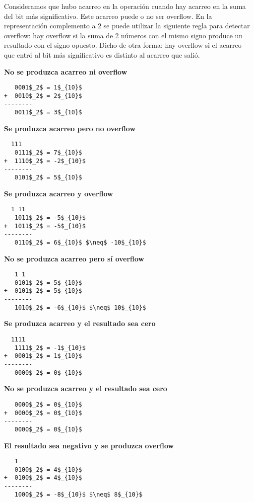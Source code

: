 Consideramos que hubo acarreo en la operación cuando hay acarreo en la suma del bit más significativo. Este acarreo puede o no ser overflow. En la representación complemento a 2 se puede utilizar la siguiente regla para detectar overflow: hay overflow si la suma de 2 números con el mismo signo produce un resultado con el signo opuesto. Dicho de otra forma: hay overflow si el acarreo que entró al bit más significativo es distinto al acarreo que salió.

\textbf{No se produzca acarreo ni overflow}
\begin{lstlisting}
   0001$_2$ = 1$_{10}$
+  0010$_2$ = 2$_{10}$
--------
   0011$_2$ = 3$_{10}$
\end{lstlisting}

\textbf{Se produzca acarreo pero no overflow}
\begin{lstlisting}
  111
   0111$_2$ = 7$_{10}$
+  1110$_2$ = -2$_{10}$
--------
   0101$_2$ = 5$_{10}$
\end{lstlisting}

\textbf{Se produzca acarreo y overflow}
\begin{lstlisting}
  1 11
   1011$_2$ = -5$_{10}$
+  1011$_2$ = -5$_{10}$
--------
   0110$_2$ = 6$_{10}$ $\neq$ -10$_{10}$
\end{lstlisting}

\textbf{No se produzca acarreo pero sí overflow}
\begin{lstlisting}
   1 1
   0101$_2$ = 5$_{10}$
+  0101$_2$ = 5$_{10}$
--------
   1010$_2$ = -6$_{10}$ $\neq$ 10$_{10}$
\end{lstlisting}

\textbf{Se produzca acarreo y el resultado sea cero}
\begin{lstlisting}
  1111
   1111$_2$ = -1$_{10}$
+  0001$_2$ = 1$_{10}$
--------
   0000$_2$ = 0$_{10}$
\end{lstlisting}

\textbf{No se produzca acarreo y el resultado sea cero}
\begin{lstlisting}
   0000$_2$ = 0$_{10}$
+  0000$_2$ = 0$_{10}$
--------
   0000$_2$ = 0$_{10}$
\end{lstlisting}

\textbf{El resultado sea negativo y se produzca overflow}
\begin{lstlisting}
   1
   0100$_2$ = 4$_{10}$
+  0100$_2$ = 4$_{10}$
--------
   1000$_2$ = -8$_{10}$ $\neq$ 8$_{10}$
\end{lstlisting}

\pagebreak

